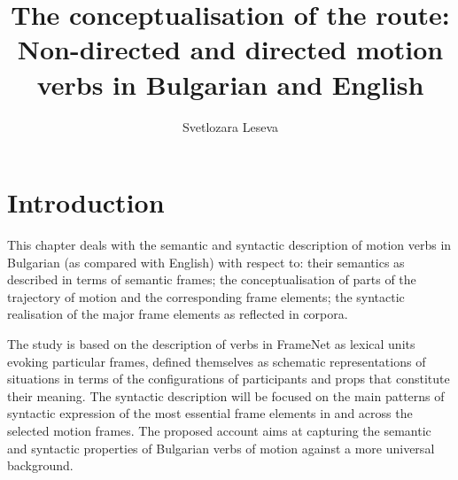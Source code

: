 \documentclass[output=paper,colorlinks,citecolor=brown]{langscibook}
\author{Svetlozara Leseva\orcid{0000-0001-8198-4555}\affiliation{Department of Computational Linguistics, Institute for Bulgarian Language, Bulgarian Academy of Sciences}}
\title[The conceptualisation of the route: Non-directed and directed motion]{The conceptualisation of the route: Non-directed and directed motion verbs in Bulgarian and English}
\begin{document}
\maketitle

\section{Introduction}\label{ch4:intro}
  
This chapter deals with the semantic and syntactic description of motion verbs in Bulgarian (as compared with English) with respect to: their semantics as described in terms of semantic frames; the conceptualisation of parts of the trajectory of motion and the corresponding frame elements; the syntactic realisation of the major frame elements as reflected in corpora. 

The study is based on the description of verbs in FrameNet \citep{Baker1998} as lexical units evoking particular frames, defined themselves as schematic representations of situations in terms of the configurations of participants and props that constitute their meaning. The syntactic description will be focused on the main patterns of syntactic expression of the most essential frame elements in and across the selected motion frames. The proposed account aims at capturing the semantic and syntactic properties of Bulgarian verbs of motion against a more universal background.

\end{document}

